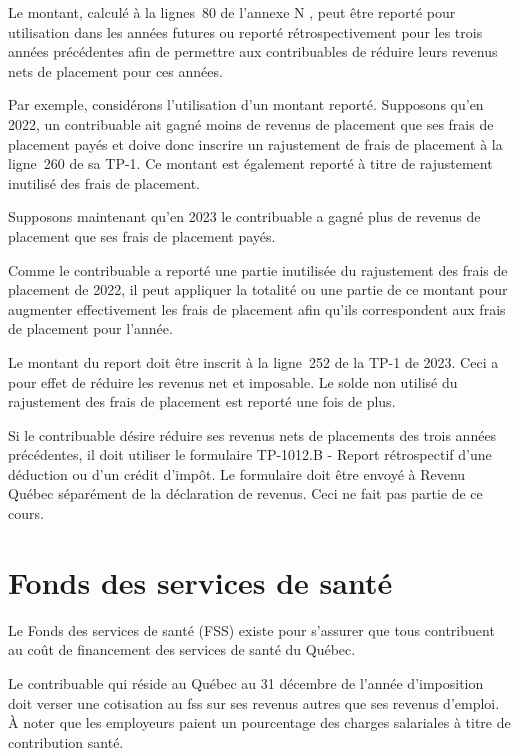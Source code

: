 Le montant, calculé à la lignes~80 de l'annexe N , peut être reporté pour utilisation dans les années futures ou reporté rétrospectivement pour les trois années précédentes afin de permettre aux contribuables de réduire leurs revenus nets de placement pour ces années. 

Par exemple, considérons l'utilisation d'un montant reporté. Supposons qu'en 2022, un contribuable ait gagné moins de revenus de placement que ses frais de placement payés et doive donc inscrire un rajustement de frais de placement à la ligne~260 de sa TP-1. Ce montant est également reporté à titre de rajustement inutilisé des frais de placement. 

Supposons maintenant qu'en 2023 le contribuable a gagné plus de revenus de placement que ses frais de placement payés. 

Comme le contribuable a reporté une partie inutilisée du rajustement des frais de placement de 2022, il peut appliquer la totalité ou une partie de ce montant pour augmenter effectivement les frais de placement afin qu'ils correspondent aux frais de placement pour l'année.

Le montant du report doit être inscrit à la ligne~252 de la TP-1 de 2023. Ceci a pour effet de réduire les revenus net et imposable. Le solde non utilisé du rajustement des frais de placement est reporté une fois de plus.

Si le contribuable désire réduire ses revenus nets de placements des trois années précédentes, il doit utiliser le formulaire TP-1012.B - Report rétrospectif d'une déduction ou d'un crédit d'impôt. Le formulaire doit être envoyé à Revenu Québec séparément de la déclaration de revenus. Ceci ne fait pas partie de ce cours.



\section{Fonds des services de santé}
\begin{intro}
	Le Fonds des services de santé (FSS) existe pour s'assurer que tous contribuent au coût de financement des services de santé du Québec.
\end{intro}
Le contribuable qui réside au Québec au 31 décembre de l'année d'imposition doit verser une cotisation au \acrfull{fss} sur ses revenus autres que ses revenus d'emploi. À noter que les employeurs paient un pourcentage des charges salariales à titre de contribution santé.

